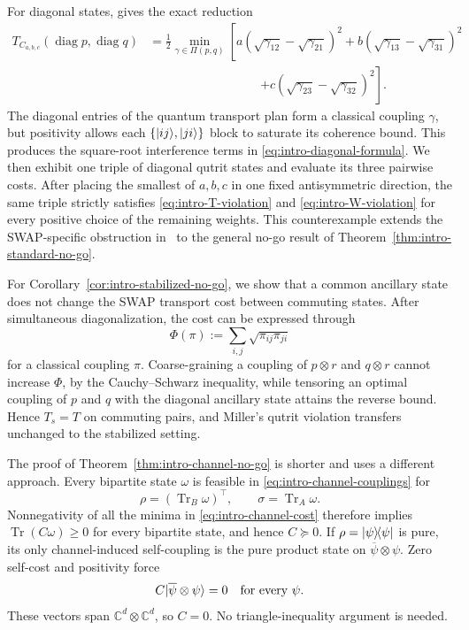 \documentclass[11pt]{article}
\newcommand{\ketbra}[2]{\ensuremath{\ket{#1}\!\bra{#2}}}
\DeclarePairedDelimiter\ket{\lvert}{\rangle}
\DeclarePairedDelimiter\bra{\langle}{\rvert}
\newcommand{\diag} {\operatorname{diag}}
\begin{document}
For diagonal states, \cite[Proposition~1]{Mil26} gives the exact reduction
\begin{equation}\label{eq:intro-diagonal-formula}
    \begin{aligned}
    T_{C_{a,b,c}}(\diag p,\diag q)
    &=
    \frac12
    \min_{\gamma\in\Pi(p,q)}
    \left[
    a\left(\sqrt{\gamma_{12}}-\sqrt{\gamma_{21}}\right)^2
    +b\left(\sqrt{\gamma_{13}}-\sqrt{\gamma_{31}}\right)^2
    \right.\\[-0.2em]
    &\hspace{9em}\left.
    +c\left(\sqrt{\gamma_{23}}-\sqrt{\gamma_{32}}\right)^2
    \right].
    \end{aligned}
\end{equation}
The diagonal entries of the quantum transport plan form a classical
coupling $\gamma$, but positivity allows each
$\{\ket{ij},\ket{ji}\}$ block to saturate its coherence bound.  This produces
the square-root interference terms in \eqref{eq:intro-diagonal-formula}.
We then exhibit one triple of diagonal qutrit states and
evaluate its three pairwise costs.  After placing the smallest of $a,b,c$ in
one fixed antisymmetric direction, the same triple strictly satisfies
\eqref{eq:intro-T-violation} and \eqref{eq:intro-W-violation} for every
positive choice of the remaining weights.  This counterexample extends the
SWAP-specific obstruction in~\cite{Mil26} to the general no-go result of
Theorem~\ref{thm:intro-standard-no-go}.

For Corollary~\ref{cor:intro-stabilized-no-go}, we show that a
common ancillary state does not change the SWAP transport cost between
commuting states.  After simultaneous diagonalization, the cost can be
expressed through
\[
    \Phi(\pi):=\sum_{i,j}\sqrt{\pi_{ij}\pi_{ji}}
\]
for a classical coupling $\pi$.  Coarse-graining a coupling of
$p\otimes r$ and $q\otimes r$ cannot increase $\Phi$, by the
Cauchy--Schwarz inequality, while tensoring an optimal coupling of $p$ and
$q$ with the diagonal ancillary state attains the reverse bound.  Hence
$T_s=T$ on commuting pairs, and Miller's qutrit violation transfers
unchanged to the stabilized setting.

The proof of Theorem~\ref{thm:intro-channel-no-go} is shorter and uses a
different approach.  Every bipartite state $\omega$ is feasible in
\eqref{eq:intro-channel-couplings} for
\[
    \rho=(\operatorname{Tr}_B\omega)^\top,
    \qquad
    \sigma=\operatorname{Tr}_A\omega.
\]
Nonnegativity of all the minima in
\eqref{eq:intro-channel-cost} therefore implies
$\operatorname{Tr}(C\omega)\geq0$ for every bipartite state, and hence
$C\succeq0$.  If $\rho=\ketbra{\psi}{\psi}$ is pure, its only
channel-induced self-coupling is the pure product state on
$\overline{\psi}\otimes\psi$.  Zero self-cost and positivity force
\[
    C\ket{\overline{\psi}\otimes\psi}=0
    \quad\text{for every }\psi.
\]
These vectors span $\mathbb{C}^d\otimes\mathbb{C}^d$, so $C=0$.  No
triangle-inequality argument is needed.
\end{document}
